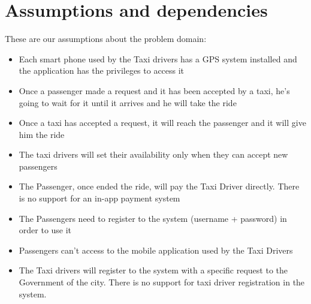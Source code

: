 \section{Assumptions and dependencies}
These are our assumptions about the problem domain:
\begin{itemize}
\item Each smart phone used by the Taxi drivers has a GPS system installed and the application has the privileges to access  it
\item Once a passenger made a request and it has been accepted by a taxi, he's going to wait for it until it arrives and he will take the ride
\item Once a taxi has accepted a request, it will reach the passenger and it will give him the ride
\item The taxi drivers will set their availability only when they can accept new passengers
\item The Passenger, once ended the ride, will pay the Taxi Driver directly. There is no support for an in-app payment system
\item The Passengers need to register to the system (username + password) in order to use it
\item Passengers can't access to the mobile application used by the Taxi Drivers
\item The Taxi drivers will register to the system with a specific request to the Government of the city. There is no support for taxi driver registration in the system.
\end{itemize}